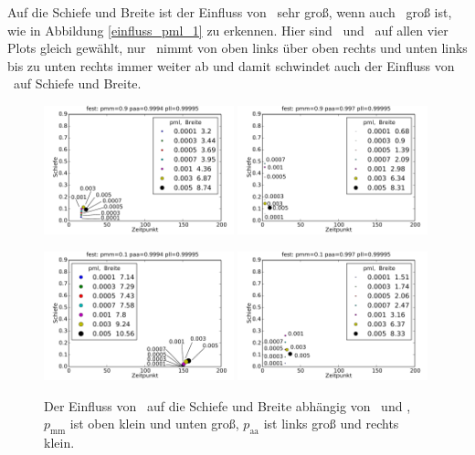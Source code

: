 Auf die Schiefe und Breite ist der Einfluss von \pml\ sehr groß, wenn auch \pll\ groß ist, wie in Abbildung \ref{einfluss_pml_1} zu erkennen. Hier sind \pmm\ und \paa\ auf allen vier Plots gleich gewählt, nur \pll\ nimmt von oben links über oben rechts und unten links bis zu unten rechts immer weiter ab und damit schwindet auch der Einfluss von \pml\ auf Schiefe und Breite.

\begin{figure}[]
\includegraphics[width=0.49\textwidth]{bilder/pml/3fest_09_p_09994_099995}
\includegraphics[width=0.49\textwidth]{bilder/pml/3fest_09_p_0997_099995}

\vspace*{5pt}

\includegraphics[width=0.49\textwidth]{bilder/pml/3fest_01_p_09994_099995}
\includegraphics[width=0.49\textwidth]{bilder/pml/3fest_01_p_0997_099995}
\caption[Der Einfluss von \pml\ auf die Schiefe und Breite abhängig von \pmm\ und \paa]{Der Einfluss von \pml\ auf die Schiefe und Breite abhängig von \pmm\ und \paa, $p_{\text{mm}}$ ist oben klein und unten groß, $p_{\text{aa}}$ ist links groß und rechts klein.}
\label{einfluss_pml_2}
\end{figure}


